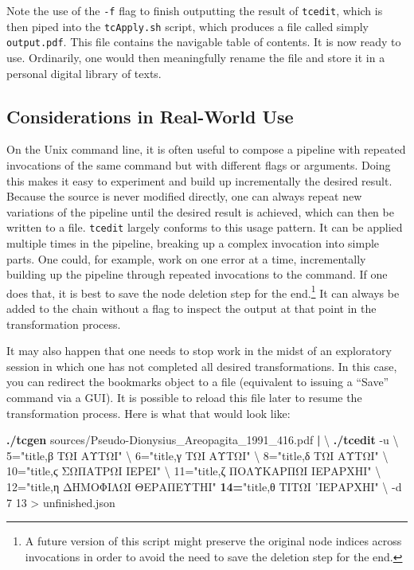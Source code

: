 \documentclass[
  letterpaper,
]{tufte-handout}
\newenvironment{Shaded}{\begin{snugshade}}{\end{snugshade}}
\newcommand{\AttributeTok}[1]{\textcolor[rgb]{0.00,0.34,0.68}{#1}}
\newcommand{\DataTypeTok}[1]{\textcolor[rgb]{0.00,0.34,0.68}{#1}}
\newcommand{\ExtensionTok}[1]{\textcolor[rgb]{0.00,0.58,1.00}{\textbf{#1}}}
\newcommand{\KeywordTok}[1]{\textcolor[rgb]{0.12,0.11,0.11}{\textbf{#1}}}
\newcommand{\NormalTok}[1]{\textcolor[rgb]{0.12,0.11,0.11}{#1}}
\newcommand{\OperatorTok}[1]{\textcolor[rgb]{0.12,0.11,0.11}{#1}}
\newcommand{\StringTok}[1]{\textcolor[rgb]{0.75,0.01,0.01}{#1}}
\begin{document}
Note the use of the \texttt{-f} flag to finish outputting the result of
\texttt{tcedit}, which is then piped into the \texttt{tcApply.sh}
script, which produces a file called simply \texttt{output.pdf}. This
file contains the navigable table of contents. It is now ready to use.
Ordinarily, one would then meaningfully rename the file and store it in
a personal digital library of texts.

\subsection{Considerations in Real-World
Use}\label{considerations-in-real-world-use}

On the Unix command line, it is often useful to compose a pipeline with
repeated invocations of the same command but with different flags or
arguments. Doing this makes it easy to experiment and build up
incrementally the desired result. Because the source is never modified
directly, one can always repeat new variations of the pipeline until the
desired result is achieved, which can then be written to a file.
\texttt{tcedit} largely conforms to this usage pattern. It can be
applied multiple times in the pipeline, breaking up a complex invocation
into simple parts. One could, for example, work on one error at a time,
incrementally building up the pipeline through repeated invocations to
the command. If one does that, it is best to save the node deletion step
for the end.\footnote{A future version of this script might preserve the
  original node indices across invocations in order to avoid the need to
  save the deletion step for the end.} It can always be added to the
chain without a flag to inspect the output at that point in the
transformation process.

It may also happen that one needs to stop work in the midst of an
exploratory session in which one has not completed all desired
transformations. In this case, you can redirect the bookmarks object to
a file (equivalent to issuing a ``Save'' command via a GUI). It is
possible to reload this file later to resume the transformation process.
Here is what that would look like:

\begin{Shaded}
\begin{Highlighting}[]
\ExtensionTok{./tcgen}\NormalTok{ sources/Pseudo{-}Dionysius\_Areopagita\_1991\_416.pdf }\KeywordTok{|} \DataTypeTok{\textbackslash{}}
\ExtensionTok{./tcedit} \AttributeTok{{-}u} \DataTypeTok{\textbackslash{}}
\NormalTok{5=}\StringTok{"title,β ΤΩΙ ΑΥΤΩΙ"} \DataTypeTok{\textbackslash{}}
\NormalTok{6=}\StringTok{"title,γ ΤΩΙ ΑΥΤΩΙ"} \DataTypeTok{\textbackslash{}}
\NormalTok{8=}\StringTok{"title,δ ΤΩΙ ΑΥΤΩΙ"} \DataTypeTok{\textbackslash{}}
\NormalTok{10=}\StringTok{"title,ϛ ΣΩΠΑΤΡΩΙ ΙEPEΙ"} \DataTypeTok{\textbackslash{}}
\NormalTok{11=}\StringTok{"title,ζ ΠΟΛΥΚΑΡΠΩΙ ΙΕΡΑΡΧΗΙ"} \DataTypeTok{\textbackslash{}}
\NormalTok{12=}\StringTok{"title,η ΔΗΜΟΦΙΛΩΙ  ΘΕΡΑΠΕΥΤΗΙ"}
\ExtensionTok{14=}\StringTok{"title,θ ΤΙΤΩΙ ᾽ΙΕΡΑΡΧΗΙ"} \DataTypeTok{\textbackslash{}}
\NormalTok{{-}d 7 13 }\OperatorTok{\textgreater{}}\NormalTok{ unfinished.json}
\end{Highlighting}
\end{Shaded}
\end{document}
